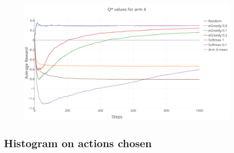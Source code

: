 \documentclass[a4paper, 11pt]{article}
\begin{document}
\begin{figure}[H]
	\centering
    \includegraphics[width=1\linewidth]{ex1_2_Q4_reward}
\end{figure}

\subsection{Histogram on actions chosen}
\end{document}
